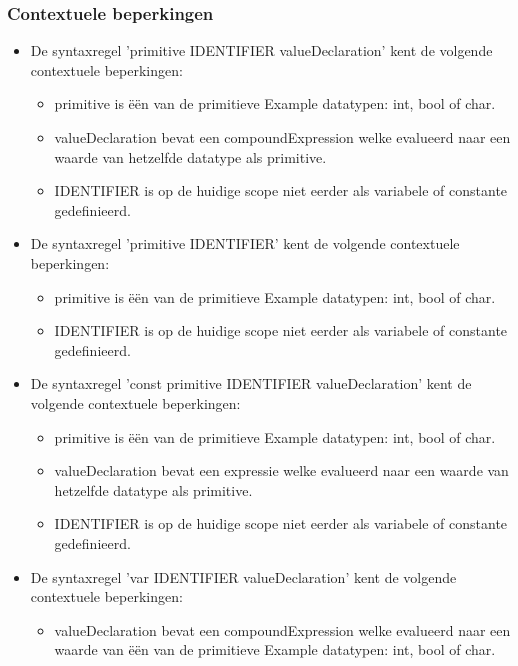     \subsubsection{Contextuele beperkingen}
        \begin{itemize}
        \item De syntaxregel 'primitive IDENTIFIER valueDeclaration' kent de volgende contextuele beperkingen:
            \begin{itemize}
            \item primitive is \"{e}\"{e}n van de primitieve Example datatypen: int, bool of char.
            \item valueDeclaration bevat een compoundExpression welke evalueerd naar een waarde van hetzelfde datatype als primitive.
            \item IDENTIFIER is op de huidige scope niet eerder als variabele of constante gedefinieerd.
            \end{itemize}        
        \item De syntaxregel 'primitive IDENTIFIER' kent de volgende contextuele beperkingen:
            \begin{itemize}
            \item primitive is \"{e}\"{e}n van de primitieve Example datatypen: int, bool of char.
            \item IDENTIFIER is op de huidige scope niet eerder als variabele of constante gedefinieerd.
            \end{itemize}  
        \item De syntaxregel 'const primitive IDENTIFIER valueDeclaration' kent de volgende contextuele beperkingen:
            \begin{itemize}
            \item primitive is \"{e}\"{e}n van de primitieve Example datatypen: int, bool of char.
            \item valueDeclaration bevat een expressie welke evalueerd naar een waarde van hetzelfde datatype als primitive.
            \item IDENTIFIER is op de huidige scope niet eerder als variabele of constante gedefinieerd.
            \end{itemize}  
        \item De syntaxregel 'var IDENTIFIER valueDeclaration' kent de volgende contextuele beperkingen:
            \begin{itemize}
            \item valueDeclaration bevat een compoundExpression welke evalueerd naar een waarde van \"{e}\"{e}n van de primitieve Example datatypen: int, bool of char.

\end{itemize}
\end{itemize}
